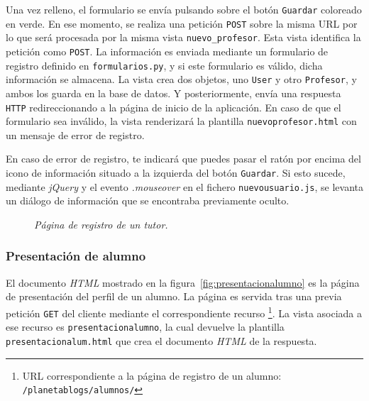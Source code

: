 \documentclass[a4paper, 12pt]{book}
\begin{document}
Una vez relleno, el formulario se env\'ia pulsando sobre el bot\'on \texttt{Guardar} coloreado en verde. En ese momento, se realiza una petici\'on 
\texttt{POST} sobre la misma URL por lo que ser\'a procesada por la misma vista \texttt{nuevo\_profesor}. Esta vista identifica la petici\'on como 
\texttt{POST}. La informaci\'on es enviada mediante un formulario de registro definido en \texttt{formularios.py}, y si este formulario es v\'alido, dicha
informaci\'on se almacena. La vista crea dos objetos, uno \texttt{User} y otro \texttt{Profesor}, y ambos los guarda en la base de datos. Y posteriormente, 
env\'ia una respuesta \texttt{HTTP} redireccionando a la p\'agina de inicio de la aplicaci\'on. En caso de que el formulario sea inv\'alido, la vista 
renderizar\'a la plantilla \texttt{nuevoprofesor.html} con un mensaje de error de registro.

En caso de error de registro, te indicar\'a que puedes pasar el rat\'on por encima del icono de informaci\'on situado a la izquierda del bot\'on 
\texttt{Guardar}. Si esto sucede, mediante \textit{jQuery} y el evento \textit{.mouseover} en el fichero \texttt{nuevousuario.js}, se levanta un di\'alogo 
de informaci\'on que se encontraba previamente oculto.
\begin{figure}
  \centering
  \caption{\textit{P\'agina de registro de un tutor.}}
  \label{fig:registrotutor}
\end{figure}


\subsubsection{Presentaci\'on de alumno} 
\label{sec:presentacionalumno}
El documento \textit{HTML} mostrado en la figura~\ref{fig:presentacionalumno} es la p\'agina de presentaci\'on del perfil de un alumno. La p\'agina es servida 
tras una previa petici\'on \texttt{GET} del cliente mediante el correspondiente recurso \footnote{URL correspondiente a la p\'agina de registro de un alumno: 
\texttt{/planetablogs/alumnos/}}. La vista asociada a ese recurso es \texttt{presentacionalumno}, la cual devuelve la plantilla 
\texttt{presentacionalum.html} que crea el documento \textit{HTML} de la respuesta.
\end{document}
